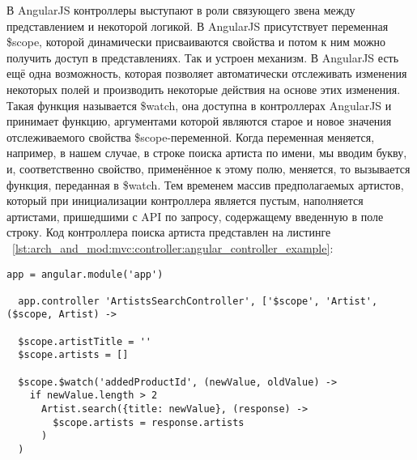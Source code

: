 В AngularJS контроллеры выступают в роли связующего звена между представлением и некоторой логикой. В AngularJS присутствует переменная \$scope, которой динамически присваиваются свойства и потом к ним можно получить доступ в представлениях. Так и устроен механизм. В AngularJS есть ещё одна возможность, которая позволяет автоматически отслеживать изменения некоторых полей и производить некоторые действия на основе этих изменения. Такая функция называется \$watch, она доступна в контроллерах AngularJS и принимает функцию, аргументами которой являются старое и новое значения отслеживаемого свойства \$scope-переменной. Когда переменная меняется, например, в нашем случае, в строке поиска артиста по имени, мы вводим букву, и, соответственно свойство, применённое к этому полю, меняется, то вызывается функция, переданная в \$watch. Тем временем массив предполагаемых артистов, который при инициализации контроллера является пустым, наполняется артистами, пришедшими с API по запросу, содержащему введенную в поле строку. Код контроллера поиска артиста представлен на листинге ~\ref{lst:arch_and_mod:mvc:controller:angular_controller_example}:

\begin{lstlisting}[style=fsharpstyle,caption={Пример получения артистов по определённым параметрам}, label=lst:arch_and_mod:mvc:controller:angular_controller_example]
  app = angular.module('app')

  app.controller 'ArtistsSearchController', ['$scope', 'Artist', ($scope, Artist) ->

  $scope.artistTitle = ''
  $scope.artists = []

  $scope.$watch('addedProductId', (newValue, oldValue) ->
    if newValue.length > 2
      Artist.search({title: newValue}, (response) ->
        $scope.artists = response.artists
      )
  )
\end{lstlisting}

